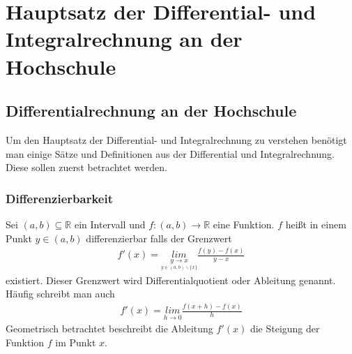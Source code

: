\documentclass[a4paper]{article}
\begin{document}
\section{Hauptsatz der Differential- und Integralrechnung an der Hochschule}
\subsection{Differentialrechnung an der Hochschule}
Um den Hauptsatz der Differential- und Integralrechnung zu verstehen benötigt man einige Sätze und Definitionen aus der Differential und Integralrechnung. Diese sollen zuerst betrachtet werden. 
\subsubsection{Differenzierbarkeit}
Sei $(a,b) \subseteq \mathbb{R}$ ein Intervall und $f: (a,b) \rightarrow \mathbb{R}$ eine Funktion. $f$ heißt in einem Punkt $y \in (a,b)$ differenzierbar falls der Grenzwert
\begin{align*}
f'(x) = \underset {\underset{y \in (a,b)\backslash \{x\}}{y \rightarrow x}}{lim}\frac{f(y) - f(x)}{y-x}
\end{align*}
existiert. Dieser Grenzwert wird Differentialquotient oder Ableitung genannt. Häufig schreibt man auch
\begin{align*}
f'(x) = \underset{h \rightarrow 0}{lim} \frac{f(x+h) - f(x)}{h}
\end{align*}
Geometrisch betrachtet beschreibt die Ableitung $f'(x)$ die Steigung der Funktion $f$ im Punkt $x$. 
\end{document}
